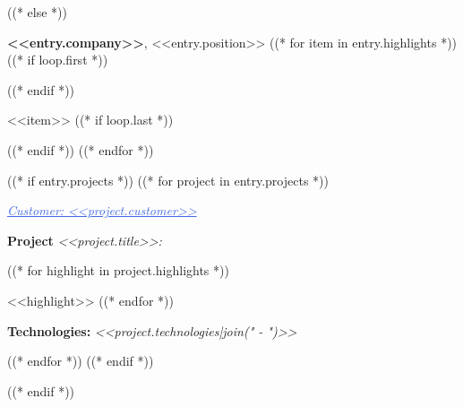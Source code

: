 ((* else *))
\begin{onecolentry}
    \fontsize{12}{16}
    \textcolor{secondaryColor}{\faBriefcase\hspace{4pt}\textbf{<<entry.company>>},} <<entry.position>>
    \normalsize
    ((* for item in entry.highlights *))
        ((* if loop.first *))
    \begin{highlights}
        ((* endif *))
        \item <<item>>
        ((* if loop.last *))
    \end{highlights}
        ((* endif *))
    ((* endfor *))

    ((* if entry.projects *))
    \vspace{<<design.margins.projects_area.vertical_between_projects>>}
    ((* for project in entry.projects *))
        \vspace{<<design.margins.projects_area.vertical_between_projects>>}

        \textcolor{RoyalBlue}{\faAngleDoubleRight\hspace{0.1cm}\underline{\textit{Customer:} \textit{<<project.customer>>}}}

        \vspace{0.2cm}
        \textbf{Project \faAngleRight} \textit{<<project.title>>:}

        \begin{highlights}
            ((* for highlight in project.highlights *))
                \item <<highlight>>
            ((* endfor *))
        \end{highlights}
        \faBuffer
        \textbf{ Technologies:} \textit{<<project.technologies|join(" - ")>>}
        \vspace{<<design.margins.projects_area.vertical_between_projects>>}

    ((* endfor *))
    ((* endif *))
\end{onecolentry}
((* endif *))